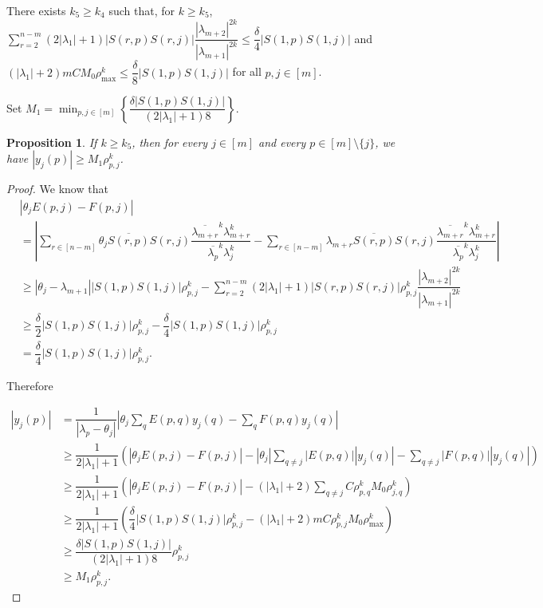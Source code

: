 \documentclass[11pt,a4paper]{article}
\theoremstyle{plain}              %
\newtheorem{proposition}[theorem]{Proposition}
\theoremstyle{definition}         %
\begin{document}
There exists \(k_5\geq k_4\) such that, for \(k\geq k_5\), \(\sum_{r=2}^{n-m}(2|\lambda_1|+1)|S(r,p)S(r,j)|\dfrac{|\lambda_{m+2}|^{2k}}{|\lambda_{m+1}|^{2k}}\leq\dfrac{\delta}{4}|S(1,p)S(1,j)|\) and \((|\lambda_1|+2)mCM_0\rho_{\max}^k\leq\dfrac{\delta}{8}|S(1,p)S(1,j)|\) for all \(p,j\in[m]\).

Set \(M_1=\min_{p,j\in[m]}\left\{\dfrac{\delta|S(1,p)S(1,j)|}{(2|\lambda_1|+1)8}\right\}\).

\begin{proposition}
If \(k\geq k_5\), then for every \(j\in[m]\) and every \(p\in[m]\setminus\{j\}\), we have \(|y_j(p)|\geq M_1\rho_{p,j}^k\).
\end{proposition}
\begin{proof}
We know that
\begin{align*}
&|\theta_jE(p,j)-F(p,j)|\\
&=\left|\sum_{r\in[n-m]}\theta_j\overline{S(r,p)}S(r,j)\dfrac{\overline{\lambda_{m+r}}^k\lambda_{m+r}^k}{\overline{\lambda_p}^k\lambda_j^k}-\sum_{r\in[n-m]}\lambda_{m+r}\overline{S(r,p)}S(r,j)\dfrac{\overline{\lambda_{m+r}}^k\lambda_{m+r}^k}{\overline{\lambda_p}^k\lambda_j^k}\right|\\
&\geq|\theta_j-\lambda_{m+1}||S(1,p)S(1,j)|\rho_{p,j}^k-\sum_{r=2}^{n-m}(2|\lambda_1|+1)|S(r,p)S(r,j)|\rho_{p,j}^k\dfrac{|\lambda_{m+2}|^{2k}}{|\lambda_{m+1}|^{2k}}\\
&\geq\dfrac{\delta}{2}|S(1,p)S(1,j)|\rho_{p,j}^k-\dfrac{\delta}{4}|S(1,p)S(1,j)|\rho_{p,j}^k\\
&=\dfrac{\delta}{4}|S(1,p)S(1,j)|\rho_{p,j}^k.
\end{align*}

Therefore

\begin{align*}
|y_j(p)|&=\dfrac{1}{|\lambda_p-\theta_j|}\left|\theta_j\sum_{q}E(p,q)y_j(q)-\sum_{q}F(p,q)y_j(q)\right|\\
&\geq\dfrac{1}{2|\lambda_1|+1}\left(|\theta_jE(p,j)-F(p,j)|-|\theta_j|\sum_{q\neq j}|E(p,q)||y_j(q)|-\sum_{q\neq j}|F(p,q)||y_j(q)|\right)\\
&\geq\dfrac{1}{2|\lambda_1|+1}\left(|\theta_jE(p,j)-F(p,j)|-(|\lambda_1|+2)\sum_{q\neq j}C\rho_{p,q}^kM_0\rho_{j,q}^k\right)\\
&\geq\dfrac{1}{2|\lambda_1|+1}\left(\dfrac{\delta}{4}|S(1,p)S(1,j)|\rho_{p,j}^k-(|\lambda_1|+2)mC\rho_{p,j}^kM_0\rho_{\max}^k\right)\\
&\geq\dfrac{\delta|S(1,p)S(1,j)|}{(2|\lambda_1|+1)8}\rho_{p,j}^k\\
&\geq M_1\rho_{p,j}^k.
\end{align*}
\end{proof}
\end{document}
